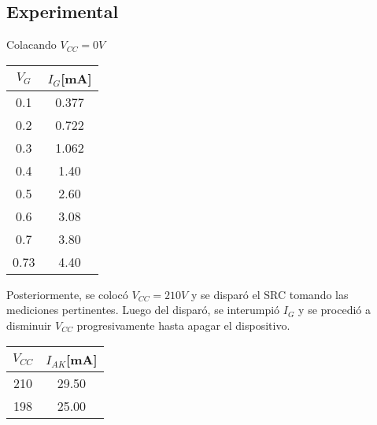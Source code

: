 \subsection{Experimental} %
Colacando $V_{CC}=0V$ 
\par 
\begin{minipage}{0.3\linewidth}
  \centering
  \begin{table}[H]
    \begin{center}
      \begin{tabular}{c|c}
        $V_{G}$ &$I_{G}$[mA]   \\
        \hline
        0.1   &0.377 \\
        0.2   &0.722 \\
        0.3   &1.062 \\
        0.4   &1.40  \\
        0.5   &2.60  \\
        0.6   &3.08  \\
        0.7   &3.80  \\
        0.73  &4.40  \\
      \end{tabular}
    \end{center} 
  \end{table}
\end{minipage}
\begin{minipage}{0.7\linewidth}
  \centering
\end{minipage}
Posteriormente, se colocó $V_{CC}=210V$ y se disparó el SRC tomando las mediciones pertinentes. 
Luego del disparó, se interumpió $I_G$ y se procedió a disminuir $V_{CC}$ progresivamente hasta apagar el dispositivo.
\begin{table}[H]
  \begin{center}
    \begin{tabular}{c|c}
      $V_{CC}$ &$I_{AK}$[mA]   \\
      \hline
      210   &29.50   \\
      198   &25.00  \\
    \end{tabular}
  \end{center} 
\end{table}
